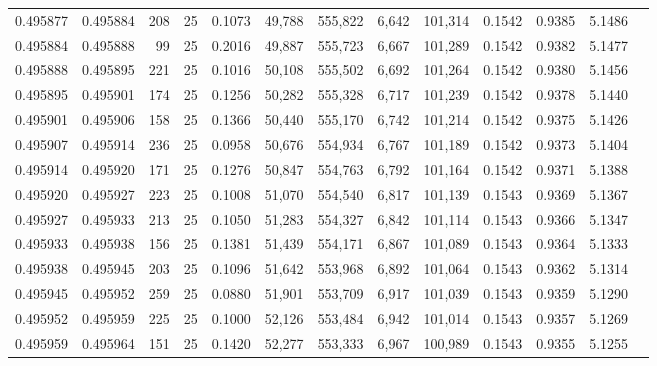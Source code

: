 \begin{tabular}{rrrrrrrrrrrrr}
0.495877 & 0.495884 & 208 &  25 &                                     0.1073 &  49,788 & 555,822 &   6,642 & 101,314 & 0.1542 & 0.9385 & 5.1486 \\
0.495884 & 0.495888 &  99 &  25 &                                     0.2016 &  49,887 & 555,723 &   6,667 & 101,289 & 0.1542 & 0.9382 & 5.1477 \\
0.495888 & 0.495895 & 221 &  25 &                                     0.1016 &  50,108 & 555,502 &   6,692 & 101,264 & 0.1542 & 0.9380 & 5.1456 \\
0.495895 & 0.495901 & 174 &  25 &                                     0.1256 &  50,282 & 555,328 &   6,717 & 101,239 & 0.1542 & 0.9378 & 5.1440 \\
0.495901 & 0.495906 & 158 &  25 &                                     0.1366 &  50,440 & 555,170 &   6,742 & 101,214 & 0.1542 & 0.9375 & 5.1426 \\
0.495907 & 0.495914 & 236 &  25 &                                     0.0958 &  50,676 & 554,934 &   6,767 & 101,189 & 0.1542 & 0.9373 & 5.1404 \\
0.495914 & 0.495920 & 171 &  25 &                                     0.1276 &  50,847 & 554,763 &   6,792 & 101,164 & 0.1542 & 0.9371 & 5.1388 \\
0.495920 & 0.495927 & 223 &  25 &                                     0.1008 &  51,070 & 554,540 &   6,817 & 101,139 & 0.1543 & 0.9369 & 5.1367 \\
0.495927 & 0.495933 & 213 &  25 &                                     0.1050 &  51,283 & 554,327 &   6,842 & 101,114 & 0.1543 & 0.9366 & 5.1347 \\
0.495933 & 0.495938 & 156 &  25 &                                     0.1381 &  51,439 & 554,171 &   6,867 & 101,089 & 0.1543 & 0.9364 & 5.1333 \\
0.495938 & 0.495945 & 203 &  25 &                                     0.1096 &  51,642 & 553,968 &   6,892 & 101,064 & 0.1543 & 0.9362 & 5.1314 \\
0.495945 & 0.495952 & 259 &  25 &                                     0.0880 &  51,901 & 553,709 &   6,917 & 101,039 & 0.1543 & 0.9359 & 5.1290 \\
0.495952 & 0.495959 & 225 &  25 &                                     0.1000 &  52,126 & 553,484 &   6,942 & 101,014 & 0.1543 & 0.9357 & 5.1269 \\
0.495959 & 0.495964 & 151 &  25 &                                     0.1420 &  52,277 & 553,333 &   6,967 & 100,989 & 0.1543 & 0.9355 & 5.1255 \\

\end{tabular}
